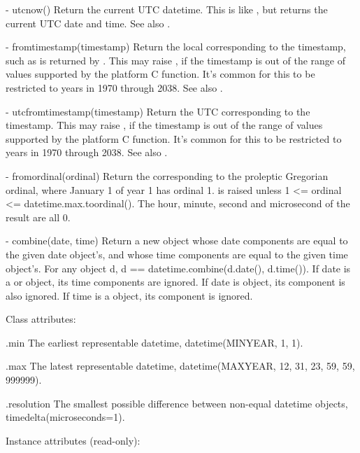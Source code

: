   - utcnow()
    Return the current UTC datetime.  This is like , but
    returns the current UTC date and time.
    See also .

  - fromtimestamp(timestamp)
    Return the local  corresponding to the \POSIX{}
    timestamp, such as is returned by .  This
    may raise , if the timestamp is out of the
    range of values supported by the platform C
     function.  It's common for this to be
    restricted to years in 1970 through 2038.
    See also .

  - utcfromtimestamp(timestamp)
    Return the UTC  corresponding to the \POSIX{}
    timestamp.  This may raise , if the
    timestamp is out of the range of values supported by the platform
    C  function.  It's common for this to be
    restricted to years in 1970 through 2038.
    See also .

  - fromordinal(ordinal)
    Return the  corresponding to the proleptic
    Gregorian ordinal, where January 1 of year 1 has ordinal 1.
     is raised unless 1 <= ordinal <=
    datetime.max.toordinal().  The hour, minute, second and
    microsecond of the result are all 0.

  - combine(date, time)
    Return a new  object whose date components are
    equal to the given date object's, and whose time components are
    equal to the given time object's.  For any  object
    d, d == datetime.combine(d.date(), d.time()).
    If date is a  or  object, its
    time components are ignored.  If date is 
    object, its  component is also ignored.  If time is
    a  object, its  component is ignored.

Class attributes:

    .min
        The earliest representable datetime,
        datetime(MINYEAR, 1, 1).

    .max
        The latest representable datetime,
        datetime(MAXYEAR, 12, 31, 23, 59, 59, 999999).

    .resolution
        The smallest possible difference between non-equal datetime
        objects, timedelta(microseconds=1).

Instance attributes (read-only):

